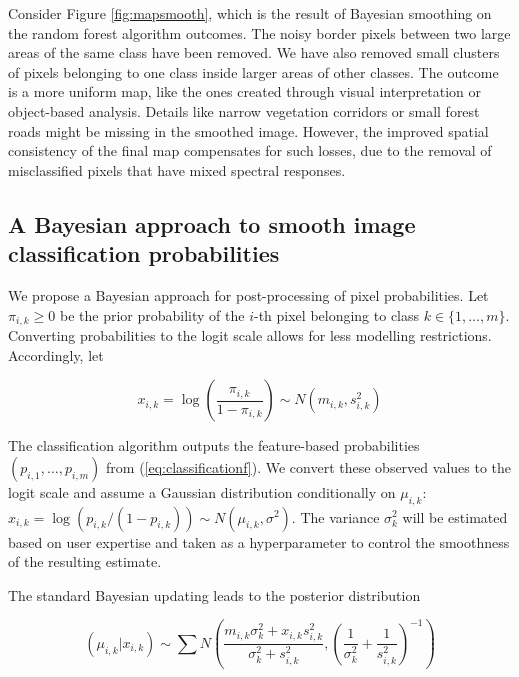 \documentclass[
  shortnames]{jss}
\begin{document}
Consider Figure \ref{fig:mapsmooth}, which is the result of Bayesian smoothing on the random forest algorithm outcomes. The noisy border pixels between two large areas of the same class have been removed. We have also removed small clusters of pixels belonging to one class inside larger areas of other classes. The outcome is a more uniform map, like the ones created through visual interpretation or object-based analysis. Details like narrow vegetation corridors or small forest roads might be missing in the smoothed image. However, the improved spatial consistency of the final map compensates for such losses, due to the removal of misclassified pixels that have mixed spectral responses.

\hypertarget{a-bayesian-approach-to-smooth-image-classification-probabilities}{%
\subsection{A Bayesian approach to smooth image classification probabilities}\label{a-bayesian-approach-to-smooth-image-classification-probabilities}}

We propose a Bayesian approach for post-processing of pixel probabilities. Let \(\pi_{i,k} \geq 0\) be the prior probability of the \(i\)-th pixel belonging to class \(k \in \{1, \ldots, m\}\). Converting probabilities to the logit scale allows for less modelling restrictions. Accordingly, let

\begin{equation} 
x_{i,k} = \log\left( \frac{\pi_{i,k}}{1-\pi_{i,k}} \right) \sim N(m_{i,k}, s^2_{i,k}) 
\end{equation}

The classification algorithm outputs the feature-based probabilities \((p_{i,1}, \ldots, p_{i,m})\) from (\ref{eq:classificationf}). We convert these observed values to the logit
scale and assume a Gaussian distribution conditionally on \(\mu_{i,k}\):
\(x_{i,k} = \log(p_{i,k}/(1-p_{i,k})) \sim N(\mu_{i,k}, \sigma^2)\).
The variance \(\sigma^2_{k}\) will be estimated based on user expertise and taken as a hyperparameter to control the smoothness of the resulting estimate.

The standard Bayesian updating \citep{Gelman2014} leads to the posterior distribution

\begin{equation}
(\mu_{i,k} | x_{i,k}) \sim \sum N\left(  \frac{m_{i,k} \sigma^2_{k} +
    x_{i,k} s^2_{i,k}}{ \sigma^2_{k} +s^2_{i,k}} , \left( \frac{1}{\sigma_k^2} + \frac{1}{s^2_{i,k}} \right)^{-1} \right) 
\label{eq:BayesUpdate}
\end{equation}
\end{document}
